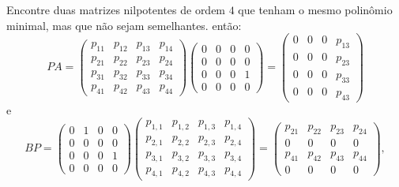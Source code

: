 \documentclass[11pt,a4paper]{article}
\begin{document}
 Encontre duas matrizes nilpotentes de ordem $4$ que tenham o mesmo polinômio minimal, mas que não sejam semelhantes.
então:
\[
PA=\begin{pmatrix}
p_{11}&p_{12}&p_{13}&p_{14}\\
p_{21}&p_{22}&p_{23}&p_{24}\\
p_{31}&p_{32}&p_{33}&p_{34}\\
p_{41}&p_{42}&p_{43}&p_{44}
\end{pmatrix}\begin{pmatrix}
0 & 0 & 0 & 0 \\
0 & 0 & 0 & 0\\
0 & 0 & 0 & 1 \\
0 & 0 & 0 & 0 
\end{pmatrix}=\begin{pmatrix}
0&0&0&p_{13}\\
0&0&0&p_{23}\\
0&0&0&p_{33}\\
0&0&0&p_{43}
\end{pmatrix}
\]
e
\[
BP=\begin{pmatrix}
0 & 1 & 0 & 0\\
0 & 0 & 0 & 0 \\
0 & 0 & 0 & 1 \\
0 & 0 & 0 & 0 \end{pmatrix}\begin{pmatrix}
p_{1,1}&p_{1,2}&p_{1,3}&p_{1,4}\\
p_{2,1}&p_{2,2}&p_{2,3}&p_{2,4}\\
p_{3,1}&p_{3,2}&p_{3,3}&p_{3,4}\\
p_{4,1}&p_{4,2}&p_{4,3}&p_{4,4}
\end{pmatrix}=\begin{pmatrix}
p_{21}&p_{22}&p_{23}&p_{24}\\
0&0&0&0\\
p_{41}&p_{42}&p_{43}&p_{44}\\
0&0&0&0
\end{pmatrix},
\]
\end{document}
